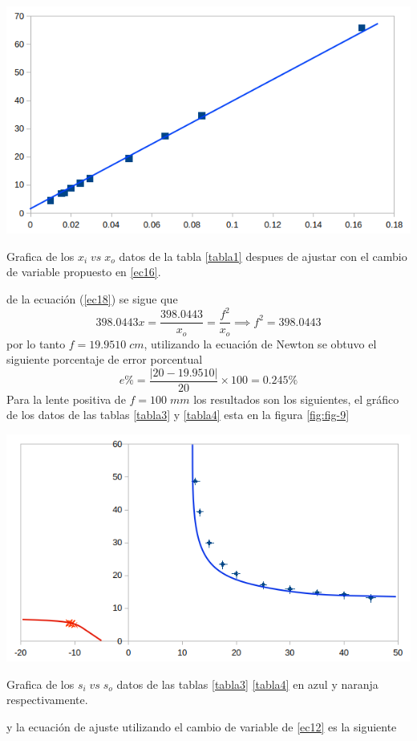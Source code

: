 \documentclass[13,twocolumn,letterpaper]{article}
\newenvironment{Figure}{\par\medskip\noindent\minipage{\linewidth}}{\endminipage\par\medskip}
\begin{document}
\begin{multicols}{2}
	\begin{Figure}
		\centering
		\includegraphics[width=\linewidth]{fig8}
		\caption{\footnotesize{Grafica de los $x_{i}\;vs\;x_{o}$ datos de la tabla \ref{tabla1} despues de ajustar con el cambio de variable propuesto en \ref{ec16}.}}
		\label{fig:fig-8}
	\end{Figure} 
de la ecuación (\ref{ec18}) se sigue que 
$$398.0443x=\dfrac{398.0443}{x_{o}}=\dfrac{f^{2}}{x_{o}}\implies f^{2}=398.0443$$
por lo tanto $f=19.9510\;cm$, utilizando la ecuación de Newton se obtuvo el siguiente porcentaje de error porcentual
$$e\%=\dfrac{|20-19.9510|}{20}\times 100=0.245 \%$$
Para la lente positiva de $f=100 \;mm$ los resultados son los siguientes, el gráfico de los datos de las tablas \ref{tabla3} y \ref{tabla4} esta en la figura \ref{fig:fig-9}
\begin{Figure}
	\centering
	\includegraphics[width=\linewidth]{fig9}
	\caption{\footnotesize{Grafica de los $s_{i}\;vs\;s_{o}$ datos de las tablas \ref{tabla3} \ref{tabla4} en azul y naranja respectivamente.}}
	\label{fig:fig-9}
\end{Figure} 
 y la ecuación de ajuste utilizando el cambio de variable de \ref{ec12} es la siguiente 

\end{multicols}
\end{document}
